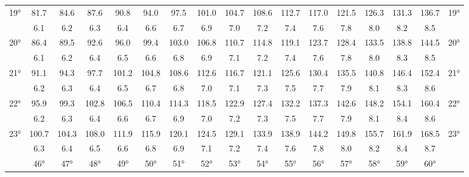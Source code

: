 \begin{footnotesize}
\begin{tabular}{c || c | c | c | c | c | c | c | c | c | c | c | c | c | c | c || c}
		\multirow{2}{*}{19°}&81.7&84.6&87.6&90.8&94.0&97.5&101.0&104.7&108.6&112.7&117.0&121.5&126.3&131.3&136.7&\multirow{2}{*}{19°}\\ \space&6.1&6.2&6.3&6.4&6.6&6.7&6.9&7.0&7.2&7.4&7.6&7.8&8.0&8.2&8.5&\space\\\hline
		\multirow{2}{*}{20°}&86.4&89.5&92.6&96.0&99.4&103.0&106.8&110.7&114.8&119.1&123.7&128.4&133.5&138.8&144.5&\multirow{2}{*}{20°}\\ \space&6.1&6.2&6.4&6.5&6.6&6.8&6.9&7.1&7.2&7.4&7.6&7.8&8.0&8.3&8.5&\space\\\hline
		\multirow{2}{*}{21°}&91.1&94.3&97.7&101.2&104.8&108.6&112.6&116.7&121.1&125.6&130.4&135.5&140.8&146.4&152.4&\multirow{2}{*}{21°}\\ \space&6.2&6.3&6.4&6.5&6.7&6.8&7.0&7.1&7.3&7.5&7.7&7.9&8.1&8.3&8.6&\space\\\hline
		\multirow{2}{*}{22°}&95.9&99.3&102.8&106.5&110.4&114.3&118.5&122.9&127.4&132.2&137.3&142.6&148.2&154.1&160.4&\multirow{2}{*}{22°}\\ \space&6.2&6.3&6.4&6.6&6.7&6.9&7.0&7.2&7.3&7.5&7.7&7.9&8.1&8.4&8.6&\space\\\hline
		\multirow{2}{*}{23°}&100.7&104.3&108.0&111.9&115.9&120.1&124.5&129.1&133.9&138.9&144.2&149.8&155.7&161.9&168.5&\multirow{2}{*}{23°}\\ \space&6.3&6.4&6.5&6.6&6.8&6.9&7.1&7.2&7.4&7.6&7.8&8.0&8.2&8.4&8.7&\space\\\hline
		\hline\space &46°&47°&48°&49°&50°&51°&52°&53°&54°&55°&56°&57°&58°&59°&60°
\end{tabular}\end{footnotesize}

